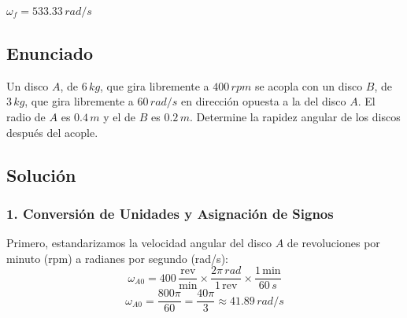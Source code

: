 \documentclass[12pt, a4paper]{article}
\begin{document}
\begin{tcolorbox}[colback=green!5!white, colframe=green!50!black, title=Respuesta Final]
\centering \Large $\omega_f = 533.33 \, \si{rad/s}$
\end{tcolorbox}

\newpage

\subsection*{Enunciado}
Un disco $A$, de $6 \, \si{kg}$, que gira libremente a $400 \, \si{rpm}$ se acopla con un disco $B$, de $3 \, \si{kg}$, que gira libremente a $60 \, \si{rad/s}$ en dirección opuesta a la del disco $A$. El radio de $A$ es $0.4 \, \si{m}$ y el de $B$ es $0.2 \, \si{m}$. Determine la rapidez angular de los discos después del acople.

\begin{center}
\end{center}

\subsection*{Solución}

\subsubsection*{1. Conversión de Unidades y Asignación de Signos}
Primero, estandarizamos la velocidad angular del disco $A$ de revoluciones por minuto (\si{rpm}) a radianes por segundo (\si{rad/s}):
$$\omega_{A0} = 400 \, \frac{\text{rev}}{\text{min}} \times \frac{2\pi \, \si{rad}}{1 \, \text{rev}} \times \frac{1 \, \text{min}}{60 \, \si{s}}$$
$$\omega_{A0} = \frac{800\pi}{60} = \frac{40\pi}{3} \approx 41.89 \, \si{rad/s}$$
\end{document}
